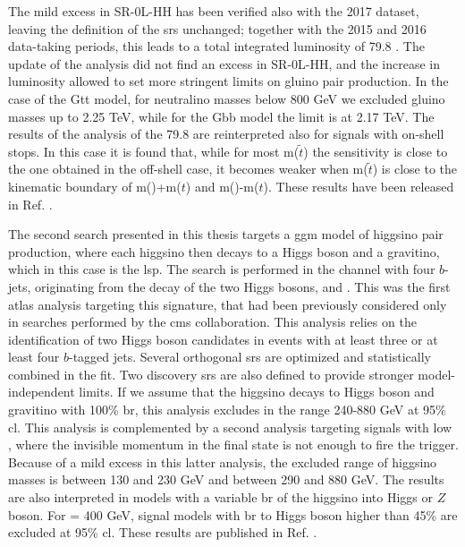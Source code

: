 The mild excess in SR-0L-HH has been verified also with the 2017 dataset,
leaving the definition of the \glspl{sr} unchanged; 
together with the 2015 and 2016 data-taking periods, this leads to a total integrated luminosity 
of 79.8 \ifb. 
The update of the analysis did not find an excess in SR-0L-HH, and the increase in luminosity 
allowed to set more stringent limits on gluino pair production. 
In the case of the Gtt model, for neutralino masses below 800 GeV we excluded gluino masses up to 
2.25 TeV, while for the Gbb model the limit is at 2.17 TeV. 
The results of the analysis of the 79.8 \ifb are reinterpreted also for signals with on-shell 
stops. In this case it is found that, while for most m($\tilde{t}$) the sensitivity 
is close to the one obtained in the off-shell case, it becomes weaker 
when m($\tilde{t}$) is close to the kinematic boundary of 
m(\ninoone)+m($t$) and m(\gluino)-m($t$).  
These results have been released in Ref. \cite{ATLAS-CONF-2018-041}.


The second search presented in this thesis targets a \gls{ggm} model of higgsino pair production, 
where each higgsino then decays to a Higgs boson and 
a gravitino, which in this case is the \gls{lsp}. The search is performed in the channel with four $b$-jets, originating from 
the decay of the two Higgs bosons, and \met. 
This was the first \gls{atlas} analysis targeting this signature, that had been 
previously considered only in searches performed by the \gls{cms} collaboration.
This analysis relies on the identification of two Higgs boson candidates in events with at least three or 
at least four $b$-tagged jets. Several orthogonal \glspl{sr} are optimized and statistically combined in the fit. 
Two discovery \glspl{sr} are also defined to provide stronger model-independent limits. 
If we assume that the higgsino decays to Higgs boson and gravitino with 100\% \gls{br}, 
this analysis excludes \mhino in the range 240-880 GeV at 95\% \gls{cl}. 
This analysis is complemented by a second analysis targeting signals with low \mhino, where the 
invisible momentum in the final state is not enough to fire the \met trigger. 
Because of a mild excess in this latter analysis, the excluded range of higgsino masses is 
between 130 and 230 GeV and between 290 and 880 GeV.
The results are also interpreted in models with a variable \gls{br} of the higgsino into Higgs or $Z$ boson. 
For \mhino = 400 GeV, signal models with \gls{br} to Higgs boson higher than 45\% are 
excluded at 95\% \gls{cl}.
These results are published in Ref. \cite{Aaboud:2018htj}. 

